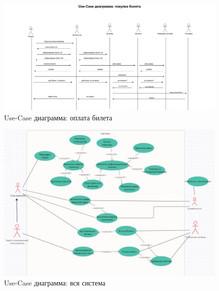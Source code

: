 \begin{figure}
      \includegraphics[width=16cm]{4-actions/use-case-payment.drawio.png}
      \centering
      \caption{Use-Case диаграмма: оплата билета}
\end{figure}

\begin{figure}
      \includegraphics[width=16cm]{4-actions/use-case.jpg}
      \centering
      \caption{Use-Case диаграмма: вся система}
\end{figure}
